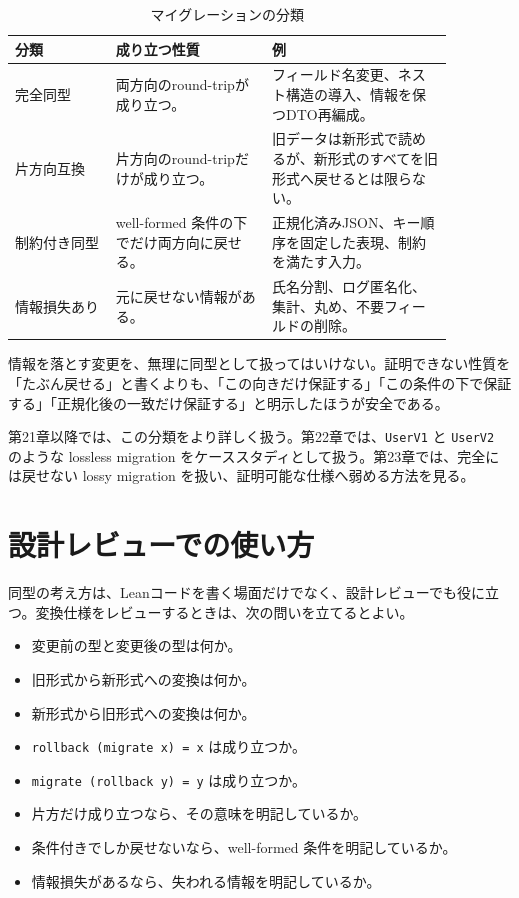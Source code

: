 
\begin{table}[htbp]
\centering
\begin{tabular}{p{0.20\linewidth}p{0.31\linewidth}p{0.36\linewidth}}
\toprule
分類 & 成り立つ性質 & 例 \\
\midrule
完全同型 & 両方向のround-tripが成り立つ。 & フィールド名変更、ネスト構造の導入、情報を保つDTO再編成。 \\
片方向互換 & 片方向のround-tripだけが成り立つ。 & 旧データは新形式で読めるが、新形式のすべてを旧形式へ戻せるとは限らない。 \\
制約付き同型 & well-formed 条件の下でだけ両方向に戻せる。 & 正規化済みJSON、キー順序を固定した表現、制約を満たす入力。 \\
情報損失あり & 元に戻せない情報がある。 & 氏名分割、ログ匿名化、集計、丸め、不要フィールドの削除。 \\
\bottomrule
\end{tabular}
\caption{マイグレーションの分類}
\label{tab:ch06-migration-classification}
\end{table}

\begin{warningbox}
情報を落とす変更を、無理に同型として扱ってはいけない。証明できない性質を「たぶん戻せる」と書くよりも、「この向きだけ保証する」「この条件の下で保証する」「正規化後の一致だけ保証する」と明示したほうが安全である。
\end{warningbox}

第21章以降では、この分類をより詳しく扱う。第22章では、\texttt{UserV1} と \texttt{UserV2} のような lossless migration をケーススタディとして扱う。第23章では、完全には戻せない lossy migration を扱い、証明可能な仕様へ弱める方法を見る。

\section{設計レビューでの使い方}
\label{sec:ch06-review}

同型の考え方は、Leanコードを書く場面だけでなく、設計レビューでも役に立つ。変換仕様をレビューするときは、次の問いを立てるとよい。

\begin{itemize}
\item 変更前の型と変更後の型は何か。
\item 旧形式から新形式への変換は何か。
\item 新形式から旧形式への変換は何か。
\item \texttt{rollback (migrate x) = x} は成り立つか。
\item \texttt{migrate (rollback y) = y} は成り立つか。
\item 片方だけ成り立つなら、その意味を明記しているか。
\item 条件付きでしか戻せないなら、well-formed 条件を明記しているか。
\item 情報損失があるなら、失われる情報を明記しているか。
\end{itemize}

